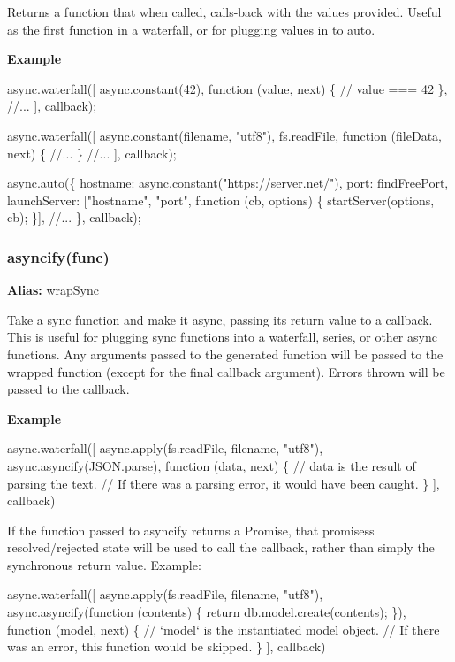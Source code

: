 Returns a function that when called, calls-\/back with the values provided. Useful as the first function in a {\ttfamily waterfall}, or for plugging values in to {\ttfamily auto}.

{\bfseries Example}


\begin{DoxyCode}
async.waterfall([
  async.constant(42),
  function (value, next) \{
    // value === 42
  \},
  //...
], callback);

async.waterfall([
  async.constant(filename, "utf8"),
  fs.readFile,
  function (fileData, next) \{
    //...
  \}
  //...
], callback);

async.auto(\{
  hostname: async.constant("https://server.net/"),
  port: findFreePort,
  launchServer: ["hostname", "port", function (cb, options) \{
    startServer(options, cb);
  \}],
  //...
\}, callback);
\end{DoxyCode}
 



\label{_asyncify}%
 \label{_wrapSync}%
 \subsubsection*{asyncify(func)}

{\bfseries Alias\+:} {\ttfamily wrap\+Sync}

Take a sync function and make it async, passing its return value to a callback. This is useful for plugging sync functions into a waterfall, series, or other async functions. Any arguments passed to the generated function will be passed to the wrapped function (except for the final callback argument). Errors thrown will be passed to the callback.

{\bfseries Example}


\begin{DoxyCode}
async.waterfall([
  async.apply(fs.readFile, filename, "utf8"),
  async.asyncify(JSON.parse),
  function (data, next) \{
    // data is the result of parsing the text.
    // If there was a parsing error, it would have been caught.
  \}
], callback)
\end{DoxyCode}


If the function passed to {\ttfamily asyncify} returns a Promise, that promises\textquotesingle{}s resolved/rejected state will be used to call the callback, rather than simply the synchronous return value. Example\+:


\begin{DoxyCode}
async.waterfall([
  async.apply(fs.readFile, filename, "utf8"),
  async.asyncify(function (contents) \{
    return db.model.create(contents);
  \}),
  function (model, next) \{
    // `model` is the instantiated model object. 
    // If there was an error, this function would be skipped.
  \}
], callback)
\end{DoxyCode}


